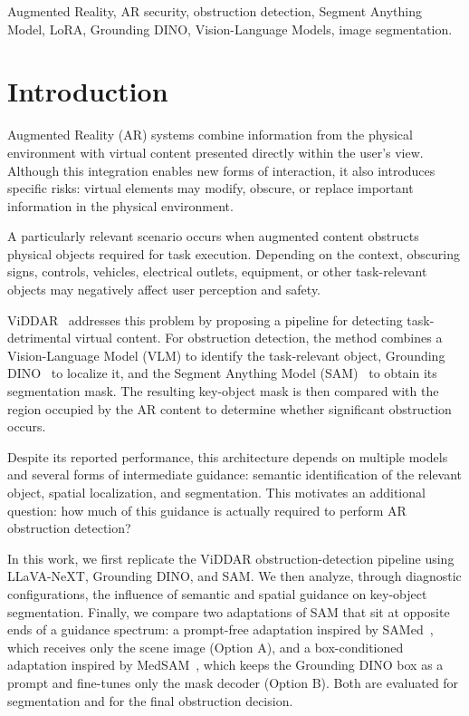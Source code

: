 \documentclass[conference]{IEEEtran}
\begin{document}
\begin{IEEEkeywords}
Augmented Reality, AR security, obstruction detection, Segment Anything Model, LoRA, Grounding DINO, Vision-Language Models, image segmentation.
\end{IEEEkeywords}



\section{Introduction}

Augmented Reality (AR) systems combine information from the physical environment with virtual content presented directly within the user's view. Although this integration enables new forms of interaction, it also introduces specific risks: virtual elements may modify, obscure, or replace important information in the physical environment.

A particularly relevant scenario occurs when augmented content obstructs physical objects required for task execution. Depending on the context, obscuring signs, controls, vehicles, electrical outlets, equipment, or other task-relevant objects may negatively affect user perception and safety.

ViDDAR~\cite{viddar} addresses this problem by proposing a pipeline for detecting task-detrimental virtual content. For obstruction detection, the method combines a Vision-Language Model (VLM) to identify the task-relevant object, Grounding DINO~\cite{groundingdino} to localize it, and the Segment Anything Model (SAM)~\cite{sam} to obtain its segmentation mask. The resulting key-object mask is then compared with the region occupied by the AR content to determine whether significant obstruction occurs.

Despite its reported performance, this architecture depends on multiple models and several forms of intermediate guidance: semantic identification of the relevant object, spatial localization, and segmentation. This motivates an additional question: how much of this guidance is actually required to perform AR obstruction detection?

In this work, we first replicate the ViDDAR obstruction-detection pipeline using LLaVA-NeXT, Grounding DINO, and SAM. We then analyze, through diagnostic configurations, the influence of semantic and spatial guidance on key-object segmentation. Finally, we compare two adaptations of SAM that sit at opposite ends of a guidance spectrum: a prompt-free adaptation inspired by SAMed~\cite{samed}, which receives only the scene image (Option A), and a box-conditioned adaptation inspired by MedSAM~\cite{medsam}, which keeps the Grounding DINO box as a prompt and fine-tunes only the mask decoder (Option B). Both are evaluated for segmentation and for the final obstruction decision.
\end{document}
